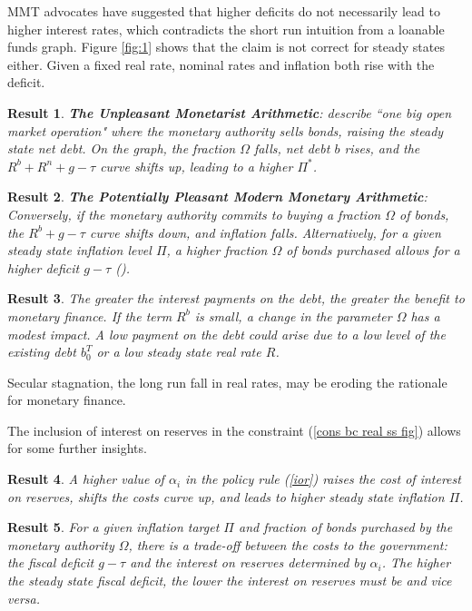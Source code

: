 \documentclass[]{article}
\newtheorem{result}{Result}
\begin{document}
MMT advocates have suggested that higher deficits do not necessarily lead to higher interest rates, which contradicts the short run intuition from a loanable funds graph. Figure \ref{fig:1} shows that the claim is not correct for steady states either. Given a fixed real rate, nominal rates and inflation both rise with the deficit.

\begin{result}
    \textbf{The Unpleasant Monetarist Arithmetic}:  \textcite{sargent2018recursive} describe ``one big open market operation" where the monetary authority sells bonds, raising the steady state net debt. On the graph, the fraction $\Omega$ falls, net debt $b$ rises, and the $R^{b}+R^{n}+g-\tau$ curve shifts up, leading to a higher $\Pi^{*}$.
\end{result}
\begin{result}
    \textbf{The Potentially Pleasant Modern Monetary Arithmetic}: Conversely, if the monetary authority commits to buying a fraction $\Omega$ of bonds, the $R^{b}+g-\tau$ curve shifts down, and inflation falls. Alternatively, for a given steady state inflation level $\Pi$, a higher fraction $\Omega$ of bonds purchased allows for a higher deficit $g-\tau$ (\cite{waters2024potentiallypleasant}). 
\end{result}
\begin{result}
    The greater the interest payments on the debt, the greater the benefit to monetary finance. If the term $R^{b}$ is small, a change in the parameter $\Omega$ has a modest impact. A low payment on the debt could arise due to a low level of the existing debt $b_{0}^{T}$ or a low steady state real rate $R$.
\end{result}
Secular stagnation, the long run fall in real rates, may be eroding the rationale for monetary finance.

The inclusion of interest on reserves in the constraint (\ref{cons bc real ss fig}) allows for some further insights.
\begin{result}
    A higher value of $\alpha_{i}$ in the policy rule (\ref{ior}) raises the cost of interest on reserves, shifts the costs curve up, and leads to higher steady state inflation $\Pi$.
\end{result}
\begin{result}
    For a given inflation target $\Pi$ and fraction of bonds purchased by the monetary authority $\Omega$, there is a trade-off between the costs to the government:  the fiscal deficit $g-\tau$ and the interest on reserves determined by $\alpha_{i}$. The higher the steady state fiscal deficit, the lower the interest on reserves must be and vice versa.
\end{result}
\end{document}
